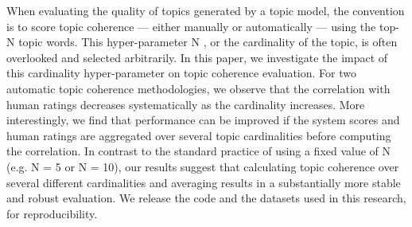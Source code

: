 When evaluating the quality of topics generated by a topic model, the convention is to score topic coherence — either manually or automatically — using the top-N topic words. This hyper-parameter N , or the cardinality of the topic, is often overlooked and selected arbitrarily. In this paper, we investigate the impact of this cardinality hyper-parameter on topic coherence evaluation. For two automatic topic coherence methodologies, we observe that the correlation with human ratings decreases systematically as the cardinality increases. More interestingly, we find that performance can be improved if the system scores and human ratings are aggregated over several topic cardinalities before computing the correlation. In contrast to the standard practice of using a fixed value of N (e.g. N = 5 or N = 10), our results suggest that calculating topic coherence over several different cardinalities and averaging results in a substantially more stable and robust evaluation. We release the code and the datasets used in this research, for reproducibility.
